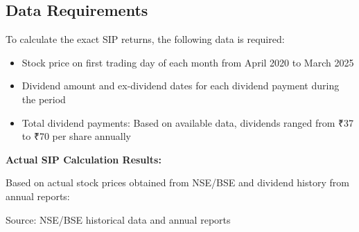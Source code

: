 \documentclass[8pt,a4paper]{article}
\begin{document}
\subsection{Data Requirements}

To calculate the exact SIP returns, the following data is required:
\begin{itemize}
    \item Stock price on first trading day of each month from April 2020 to March 2025
    \item Dividend amount and ex-dividend dates for each dividend payment during the period
    \item Total dividend payments: Based on available data, dividends ranged from ₹37 to ₹70 per share annually
\end{itemize}

\textbf{Actual SIP Calculation Results:}

Based on actual stock prices obtained from NSE/BSE and dividend history from annual reports:

\begin{table}[H]
\centering
\caption{SIP Investment Performance Summary (Actual Calculation)}
\label{tab:sip_summary}
\footnotesize
Source: NSE/BSE historical data and annual reports
\end{table}
\end{document}
